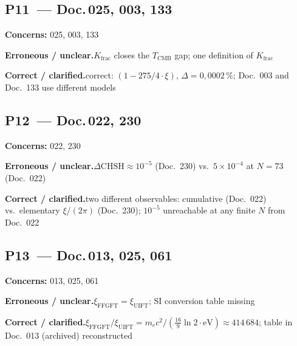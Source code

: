 \medskip


\subsection*{P11~--- Doc.\,025, 003, 133}

\noindent\textbf{Concerns:} 025, 003, 133


\smallskip\noindent\textbf{Erroneous / unclear.}\quad $K_\text{frac}$ closes the $T_\text{CMB}$ gap; \newline
  one definition of $K_\text{frac}$


\smallskip\noindent\textbf{Correct / clarified.}\quad correct: $(1-275/4\cdot\xi)$, $\Delta=0{,}0002\,\%$; \newline
  Doc.~003 and Doc.~133 use different models


\medskip


\subsection*{P12~--- Doc.\,022, 230}

\noindent\textbf{Concerns:} 022, 230


\smallskip\noindent\textbf{Erroneous / unclear.}\quad $\Delta\text{CHSH} \approx 10^{-5}$ (Doc.~230) vs.\
  $5\times10^{-4}$ at $N=73$ (Doc.~022)


\smallskip\noindent\textbf{Correct / clarified.}\quad two different observables: cumulative (Doc.~022) vs.\ elementary $\xi/(2\pi)$ (Doc.~230);
  $10^{-5}$ unreachable at any finite $N$ from Doc.~022


\medskip


\subsection*{P13~--- Doc.\,013, 025, 061}

\noindent\textbf{Concerns:} 013, 025, 061


\smallskip\noindent\textbf{Erroneous / unclear.}\quad $\xi_\text{FFGFT} = \xi_\text{UIFT}$; \newline
  SI conversion table missing


\smallskip\noindent\textbf{Correct / clarified.}\quad $\xi_\text{FFGFT}/\xi_\text{UIFT} = m_ec^2/(\frac{16}{9}\ln 2\cdot\text{eV}) \approx 414\,684$; \newline
  table in Doc.~013 (archived) reconstructed


